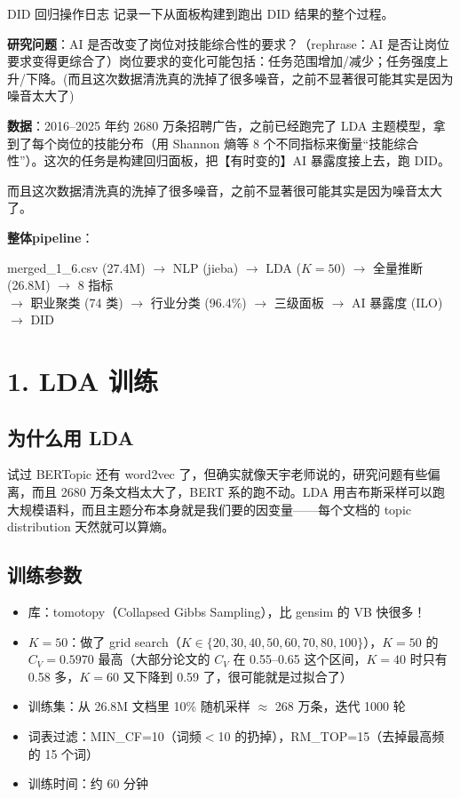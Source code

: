 \documentclass[12pt,a4paper]{article}
\begin{document}
\begin{chapterbox}{DID 回归操作日志}
记录一下从面板构建到跑出 DID 结果的整个过程。

\medskip
\textbf{研究问题}：AI 是否改变了岗位对技能综合性的要求？（rephrase：AI 是否让岗位要求变得更综合了）岗位要求的变化可能包括：任务范围增加/减少；任务强度上升/下降。(而且这次数据清洗真的洗掉了很多噪音，之前不显著很可能其实是因为噪音太大了)

\textbf{数据}：2016--2025 年约 2680 万条招聘广告，之前已经跑完了 LDA 主题模型，拿到了每个岗位的技能分布（用 Shannon 熵等 8 个不同指标来衡量“技能综合性”）。这次的任务是构建回归面板，把【有时变的】AI 暴露度接上去，跑 DID。

而且这次数据清洗真的洗掉了很多噪音，之前不显著很可能其实是因为噪音太大了。

\medskip
\textbf{整体pipeline}：
\begin{center}
\small
merged\_1\_6.csv (27.4M) $\rightarrow$ NLP (jieba) $\rightarrow$ LDA ($K{=}50$) $\rightarrow$ 全量推断 (26.8M) $\rightarrow$ 8 指标\\[2pt]
$\rightarrow$ 职业聚类 (74 类) $\rightarrow$ 行业分类 (96.4\%) $\rightarrow$ 三级面板 $\rightarrow$ AI 暴露度 (ILO) $\rightarrow$ DID
\end{center}
\end{chapterbox}

\bigskip

\section*{1. LDA 训练}

\subsection*{为什么用 LDA}

试过 BERTopic 还有 word2vec 了，但确实就像天宇老师说的，研究问题有些偏离，而且 2680 万条文档太大了，BERT 系的跑不动。LDA 用吉布斯采样可以跑大规模语料，而且主题分布本身就是我们要的因变量——每个文档的 topic distribution 天然就可以算熵。

\subsection*{训练参数}

\begin{itemize}
  \item 库：tomotopy（Collapsed Gibbs Sampling），比 gensim 的 VB 快很多！
  \item $K = 50$：做了 grid search（$K \in \{20,30,40,50,60,70,80,100\}$），$K{=}50$ 的 $C_V = 0.5970$ 最高（大部分论文的 $C_V$ 在 0.55--0.65 这个区间，$K{=}40$ 时只有 0.58 多，$K{=}60$ 又下降到 0.59 了，很可能就是过拟合了）
  \item 训练集：从 26.8M 文档里 10\% 随机采样 $\approx$ 268 万条，迭代 1000 轮
  \item 词表过滤：MIN\_CF=10（词频$<$10 的扔掉），RM\_TOP=15（去掉最高频的 15 个词）
  \item 训练时间：约 60 分钟
\end{itemize}
\end{document}
